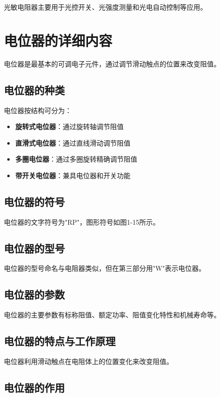 \documentclass[12pt,UTF8]{ctexbook}
\begin{document}
光敏电阻器主要用于光控开关、光强度测量和光电自动控制等应用。

\section{电位器的详细内容}

电位器是最基本的可调电子元件，通过调节滑动触点的位置来改变阻值。

\subsection{电位器的种类}

电位器按结构可分为：

\begin{itemize}[leftmargin=2cm]
	\item \textbf{旋转式电位器}：通过旋转轴调节阻值
	\item \textbf{直滑式电位器}：通过直线滑动调节阻值
	\item \textbf{多圈电位器}：通过多圈旋转精确调节阻值
	\item \textbf{带开关电位器}：兼具电位器和开关功能
\end{itemize}

\subsection{电位器的符号}

电位器的文字符号为"RP"，图形符号如图1-15所示。

\subsection{电位器的型号}

电位器的型号命名与电阻器类似，但在第三部分用"W"表示电位器。

\subsection{电位器的参数}

电位器的主要参数有标称阻值、额定功率、阻值变化特性和机械寿命等。

\subsection{电位器的特点与工作原理}

电位器利用滑动触点在电阻体上的位置变化来改变阻值。

\subsection{电位器的作用}
\end{document}
